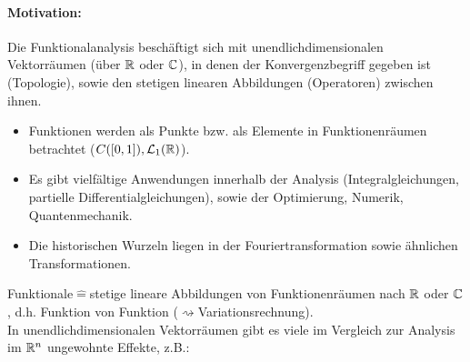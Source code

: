 \paragraph*{Motivation:}
Die Funktionalanalysis besch\"aftigt sich mit unendlichdimensionalen Vektorr\"aumen (\"uber $ \mathbb{R} $ oder $ \mathbb{C} $), in denen der Konvergenzbegriff gegeben ist (Topologie), sowie den stetigen linearen Abbildungen (Operatoren) zwischen ihnen.
\begin{itemize}
\item Funktionen werden als Punkte bzw. als Elemente in Funktionenr\"aumen betrachtet ($ C([0,1]),\mathcal L_1(\mathbb{R}) $).
\item Es gibt vielf\"altige Anwendungen innerhalb der Analysis (Integralgleichungen, partielle Differentialgleichungen), sowie der Optimierung, Numerik, Quantenmechanik.
\item Die historischen Wurzeln liegen in der Fouriertransformation sowie \"ahnlichen Transformationen.
\end{itemize}
Funktionale$ \hat{=} $stetige lineare Abbildungen von Funktionenr\"aumen nach $ \mathbb{R} $ oder $ \mathbb{C} $, d.h. Funktion von Funktion ($ \rightsquigarrow $Variationsrechnung).\\
In unendlichdimensionalen Vektorr\"aumen gibt es viele im Vergleich zur Analysis im $ \mathbb{R}^n $ ungewohnte Effekte, z.B.:
